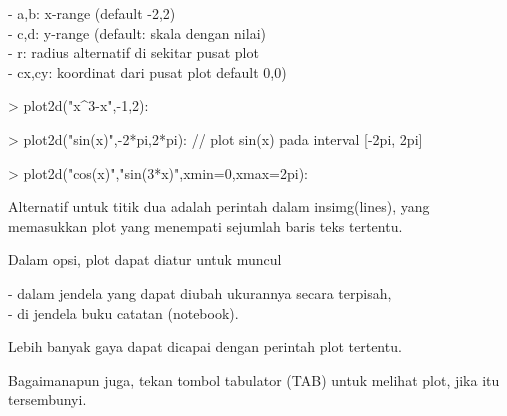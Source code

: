 \documentclass[a4paper,10pt]{article}
\begin{document}
\begin{eulernotebook}
\begin{eulercomment}
\begin{eulercomment}
\begin{eulercomment}
\begin{eulercomment}
\begin{eulercomment}
\begin{eulercomment}
\begin{eulercomment}
- a,b: x-range (default -2,2)\\
- c,d: y-range (default: skala dengan nilai)\\
- r: radius alternatif di sekitar pusat plot\\
- cx,cy: koordinat dari pusat plot default 0,0)
\end{eulercomment}
\begin{eulerprompt}
> plot2d("x^3-x",-1,2):
\end{eulerprompt}
\begin{eulerprompt}
> plot2d("sin(x)",-2*pi,2*pi): // plot sin(x) pada interval [-2pi, 2pi]
\end{eulerprompt}
\begin{eulerprompt}
> plot2d("cos(x)","sin(3*x)",xmin=0,xmax=2pi):
\end{eulerprompt}
\begin{eulercomment}
Alternatif untuk titik dua adalah perintah dalam insimg(lines), yang
memasukkan plot yang menempati sejumlah baris teks tertentu.

Dalam opsi, plot dapat diatur untuk muncul

- dalam jendela yang dapat diubah ukurannya secara terpisah,\\
- di jendela buku catatan (notebook).

Lebih banyak gaya dapat dicapai dengan perintah plot tertentu.

Bagaimanapun juga, tekan tombol tabulator (TAB) untuk melihat plot,
jika itu tersembunyi.


\end{eulercomment}
\end{eulercomment}
\end{eulercomment}
\end{eulercomment}
\end{eulercomment}
\end{eulercomment}
\end{eulercomment}
\end{eulernotebook}
\end{document}
